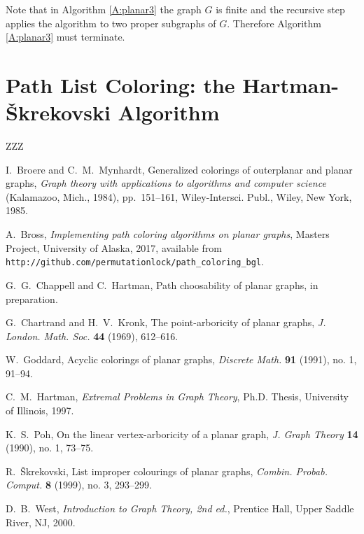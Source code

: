 \documentclass[12pt,letterpaper]{article}
\theoremstyle{plain}
\theoremstyle{definition}
\theoremstyle{break}
\begin{document}
Note that in Algorithm \ref{A:planar3} the graph $G$ is finite and the recursive
step applies the algorithm to two proper subgraphs of $G$. Therefore Algorithm
\ref{A:planar3} must terminate.


\section{Path List Coloring: the Hartman-\v{S}krekovski Algorithm}

ZZZ


\begin{thebibliography}{99}

I.~Broere and C.~M.~Mynhardt,
Generalized colorings of outerplanar and planar graphs,
\textit{Graph theory with applications to algorithms and computer science}
 (Kalamazoo, Mich., 1984),
pp.~151--161,
Wiley-Intersci. Publ., Wiley, New York, 1985.

A.~Bross,
\textit{Implementing path coloring algorithms on planar graphs},
Masters Project,
University of Alaska,
2017,
available from\hfil\break
\texttt{http://github.com/permutationlock/path\_coloring\_bgl}.

G.~G.~Chappell and C.~Hartman,
Path choosability of planar graphs,
in preparation.

G.~Chartrand and H.~V.~Kronk,
The point-arboricity of planar graphs,
\textit{J. London. Math. Soc.}
\textbf{44} (1969),
612--616.

W.~Goddard,
Acyclic colorings of planar graphs,
\textit{Discrete Math.}
\textbf{91} (1991), no. 1,
91--94.

C.~M.~Hartman,
\textit{Extremal Problems in Graph Theory},
Ph.D. Thesis,
University of Illinois,
1997.

K.~S.~Poh,
On the linear vertex-arboricity of a planar graph,
\textit{J. Graph Theory}
\textbf{14} (1990), no. 1,
73--75.

R.~\v{S}krekovski,
List improper colourings of planar graphs,
\textit{Combin. Probab. Comput.}
\textbf{8} (1999), no. 3,
293--299.

D.~B.~West,
\textit{Introduction to Graph Theory, 2nd ed.},
Prentice Hall,
Upper Saddle River, NJ,
2000.

\end{thebibliography}
\end{document}

